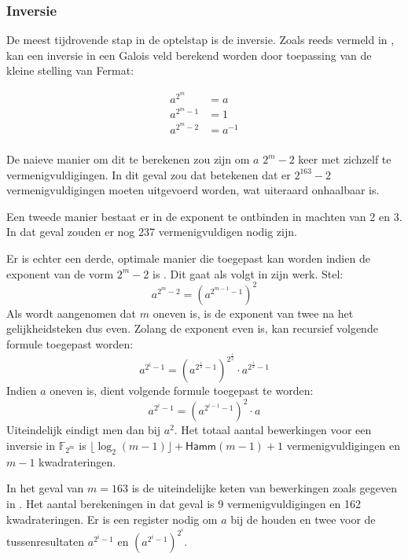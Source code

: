 \subsubsection{Inversie}

De meest tijdrovende stap in de optelstap is de inversie.  Zoals reeds vermeld in , kan een inversie in een Galois veld berekend worden door toepassing van de kleine stelling van Fermat:

\[\begin{aligned}
a^{2^m}		&= a\\
a^{2^m - 1}	&= 1\\
a^{2^m - 2}	&= a^{-1}\\
\end{aligned}\]


De naieve manier om dit te berekenen zou zijn om $a$ $2^m - 2$ keer met zichzelf te vermenigvuldigingen. In dit geval zou dat betekenen dat er $2^{163} - 2$ vermenigvuldigingen moeten uitgevoerd worden, wat uiteraard onhaalbaar is.

Een tweede manier bestaat er in de exponent te ontbinden in machten van 2 en 3. In dat geval zouden er nog 237 vermenigvuldigen nodig zijn.

Er is echter een derde, optimale manier die toegepast kan worden indien de exponent van de vorm $2^m - 2$ is \cite{batina-pkc, itoh}. Dit gaat als volgt in zijn werk. Stel:
\[a^{2^m - 2} = (a^{2^{m - 1} - 1})^2\]
Als wordt aangenomen dat $m$ oneven is, is de exponent van twee na het gelijkheidsteken dus even. Zolang de exponent even is, kan recursief volgende formule toegepast worden:
\[a^{2^i - 1} = (a^{2^{\frac{i}{2}} - 1})^{2^{\frac{i}{2}}} \cdot a^{2^{\frac{i}{2}} - 1}\]
Indien $a$ oneven is, dient volgende formule toegepast te worden:
\[a^{2^i - 1} = (a^{2^{i - 1} - 1})^2 \cdot a\]
Uiteindelijk eindigt men dan bij $a^2$. Het totaal aantal bewerkingen voor een inversie in $\mathbb{F}_{2^m}$ is $\lfloor\log_2(m - 1)\rfloor + \textsf{Hamm}(m - 1) + 1$ vermenigvuldigingen en $m - 1$ kwadrateringen.

In het geval van $m = 163$ is de uiteindelijke keten van bewerkingen zoals gegeven in . Het aantal berekeningen in dat geval is 9 vermenigvuldigingen en 162 kwadrateringen. Er is een register nodig om $a$ bij de houden en twee voor de tussenresultaten $a^{2^i - 1}$ en $(a^{2^i - 1})^{2^i}$.


